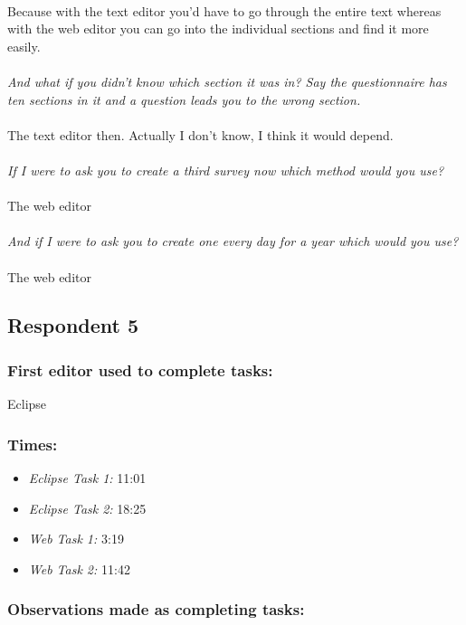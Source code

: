 \\
Because with the text editor you'd have to go through the entire text whereas with the web editor you can go into the individual sections and find it more easily.
\\
\\
\textit{And what if you didn't know which section it was in? Say the questionnaire has ten sections in it and a question leads you to the wrong section.}
\\
\\
The text editor then. Actually I don't know, I think it would depend.
\\
\\
\textit{If I were to ask you to create a third survey now which method would you use?}
\\
\\
The web editor
\\
\\
\textit{And if I were to ask you to create one every day for a year which would you use?}
\\
\\
The web editor
\subsection{Respondent 5}
\subsubsection*{First editor used to complete tasks:} Eclipse
\subsubsection*{Times:}
\begin{itemize}
\item \emph{Eclipse Task 1:} 11:01
\item \emph{Eclipse Task 2:} 18:25
\item \emph{Web Task 1:} 3:19
\item \emph{Web Task 2:} 11:42
\end{itemize}
\subsubsection*{Observations made as completing tasks:}

